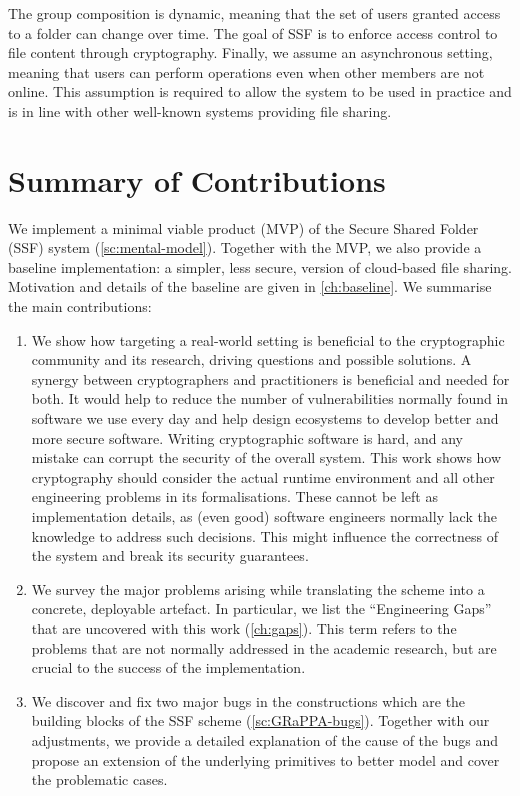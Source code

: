The group composition is dynamic, meaning that the set of users granted access to a folder can change over time.
The goal of SSF is to enforce access control to file content through cryptography.
Finally, we assume an asynchronous setting, meaning that users can
perform operations even when other members are not online.
This assumption is required to allow the system to be used in practice
and is in line with other well-known systems providing file sharing.

\section{Summary of Contributions}\label{sc:summary-of-contributions}

We implement a minimal viable product (MVP) of the Secure Shared Folder (SSF) system (\cref{sc:mental-model}).
Together with the MVP, we also provide a baseline implementation:
a simpler, less secure, version of cloud-based file sharing. Motivation
and details of the baseline are given in \cref{ch:baseline}.
We summarise the main contributions:

\begin{enumerate}
    \item We show how targeting a real-world setting is 
    beneficial to the cryptographic community and its 
    research, driving questions and possible solutions. 
    A synergy between cryptographers and practitioners 
    is beneficial and needed for both. It would help to 
    reduce the number of vulnerabilities normally found 
    in software we use every day and help design ecosystems 
    to develop better and more secure software. 
    Writing cryptographic software is hard, 
    and any mistake can corrupt the security of the overall 
    system. This work shows how cryptography 
    should consider the actual runtime environment 
    and all other engineering problems in its formalisations. 
    These cannot be left as implementation details, 
    as (even good) software engineers normally lack the 
    knowledge to address such decisions. This might influence 
    the correctness of the system and break its security guarantees.
    \item We survey the major problems arising while 
    translating the scheme into a concrete, deployable 
    artefact. In particular, we list the ``Engineering Gaps''
    that are uncovered with this work (\cref{ch:gaps}). 
    This term refers to 
    the problems that are not normally addressed in the 
    academic research, but are crucial to the success of 
    the implementation.
    \item We discover and fix two major bugs in the 
    constructions which are the building blocks of 
    the SSF scheme (\cref{sc:GRaPPA-bugs}). 
    Together with our adjustments, we provide a 
    detailed explanation of the cause of the bugs and 
    propose an extension of the underlying primitives to 
    better model and cover the problematic cases.
\end{enumerate}

